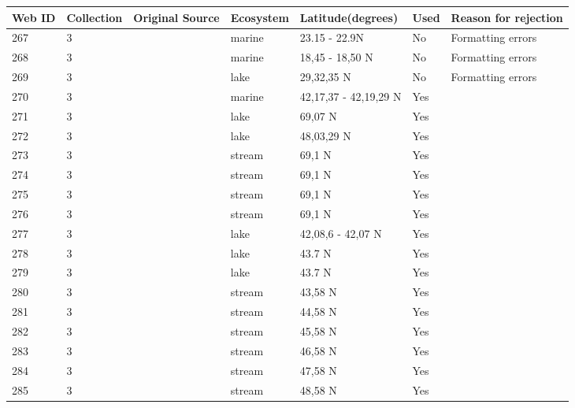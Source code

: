 \documentclass[12pt]{article}
\begin{document}
\begin{landscape}
    \begin{table}[h!]
    \centering
    {\footnotesize
      \begin{tabular}{p{2.8cm}p{1.3cm}p{3cm}p{2.2cm}p{2.5cm}lp{8.2cm}}
        \hline
        Web ID & Collection & Original Source & Ecosystem & Latitude(degrees) & Used  & Reason for rejection  \\
        \hline
        267   & 3 & \cite{Zetina-Rejon2003}  & marine & 23.15 - 22.9N & No  &  Formatting errors     \\
        268   & 3 & \cite{Cruz-Escalona2007}  & marine & 18,45 - 18,50 N & No  &  Formatting errors     \\
        269   & 3 & \cite{Liu2007}  & lake  & 29,32,35 N & No  &  Formatting errors     \\
        270   & 3 & \cite{Filgueira2011}  & marine & 42,17,37 - 42,19,29 N & Yes   &       \\
        271   & 3 & \cite{Amundsen2013}  & lake  & 69,07 N & Yes   &        \\
        272   & 3 & \cite{Hampton2011}    & lake  & 48,03,29 N & Yes   &       \\
        273   & 3 & \cite{Parker2006}  & stream & 69,1 N & Yes   &       \\
        274   & 3 & \cite{Parker2006}  & stream & 69,1 N & Yes   &       \\
        275   & 3 & \cite{Parker2006}  & stream & 69,1 N & Yes   &       \\
        276   & 3 & \cite{Parker2006}  & stream & 69,1 N & Yes   &       \\
        277   & 3 & \cite{Massana1996}  & lake  & 42,08,6 - 42,07 N & Yes   &       \\
        278   & 3 & \cite{Stewart2011}    & lake  & 43.7 N & Yes   &       \\
        279   & 3 & \cite{Stewart2011}    & lake  & 43.7 N & Yes   &       \\
        280   & 3 & \cite{Cromar1996}  & stream & 43,58 N & Yes   &       \\
        281   & 3 & \cite{Cromar1996}  & stream & 44,58 N & Yes   &       \\
        282   & 3 & \cite{Cromar1996}  & stream & 45,58 N & Yes   &       \\
        283   & 3 & \cite{Cromar1996}  & stream & 46,58 N & Yes   &       \\
        284   & 3 & \cite{Cromar1996}  & stream & 47,58 N & Yes   &       \\
        285   & 3 & \cite{Cromar1996}  & stream & 48,58 N & Yes   &       \\

\end{tabular}}
\end{table}
\end{landscape}
\end{document}

